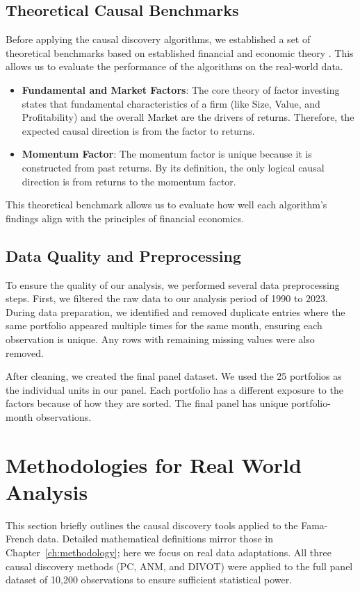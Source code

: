 \subsection*{Theoretical Causal Benchmarks}
Before applying the causal discovery algorithms, we established a set of theoretical benchmarks based on established financial and economic theory \cite{FamaFrench93, Lopez23}. This allows us to evaluate the performance of the algorithms on the real-world data.
\begin{itemize}
    \item \textbf{Fundamental and Market Factors}: The core theory of factor investing states that fundamental characteristics of a firm (like Size, Value, and Profitability) and the overall Market are the drivers of returns. Therefore, the expected causal direction is from the factor to returns.
    \item \textbf{Momentum Factor}: The momentum factor is unique because it is constructed from past returns. By its definition, the only logical causal direction is from returns to the momentum factor.
\end{itemize}
This theoretical benchmark allows us to evaluate how well each algorithm's findings align with the principles of financial economics.

\subsection*{Data Quality and Preprocessing}
To ensure the quality of our analysis, we performed several data preprocessing steps. First, we filtered the raw data to our analysis period of 1990 to 2023. During data preparation, we identified and removed duplicate entries where the same portfolio appeared multiple times for the same month, ensuring each observation is unique. Any rows with remaining missing values were also removed.

After cleaning, we created the final panel dataset. We used the 25 portfolios as the individual units in our panel. Each portfolio has a different exposure to the factors because of how they are sorted. The final panel has \RealTotalObservations{} unique portfolio-month observations.

\section{Methodologies for Real World Analysis}
\label{sec:real_methods}

This section briefly outlines the causal discovery tools applied to the Fama-French data. Detailed mathematical definitions mirror those in Chapter~\ref{ch:methodology}; here we focus on real data adaptations. All three causal discovery methods (PC, ANM, and DIVOT) were applied to the full panel dataset of 10,200 observations to ensure sufficient statistical power.

